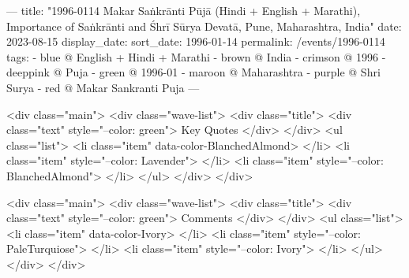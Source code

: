 ---
title: "1996-0114 Makar Saṅkrānti Pūjā (Hindi + English + Marathi), Importance of Saṅkrānti and Śhrī Sūrya Devatā, Pune, Maharashtra, India"
date: 2023-08-15
display_date: 
sort_date: 1996-01-14
permalink: /events/1996-0114
tags:
  - blue @ English + Hindi + Marathi
  - brown @ India
  - crimson @ 1996
  - deeppink @ Puja
  - green @ 1996-01
  - maroon @ Maharashtra
  - purple @ Shri Surya 
  - red @ Makar Sankranti Puja
---

<div class="main">
  <div class="wave-list">
    <div class="title">
      <div class="text" style="--color: green">
        Key Quotes
      </div>
    </div>
    <ul class="list">
        <li class="item" data-color-BlanchedAlmond>
        </li>
        <li class="item" style="--color: Lavender">
        </li>
        <li class="item" style="--color: BlanchedAlmond">
        </li>
      </ul>
  </div>
</div>

<div class="main">
  <div class="wave-list">
    <div class="title">
      <div class="text" style="--color: green">
        Comments
      </div>
    </div>
    <ul class="list">
        <li class="item" data-color-Ivory>
        </li>
        <li class="item" style="--color: PaleTurquiose">
        </li>
        <li class="item" style="--color: Ivory">
        </li>
      </ul>
  </div>
</div>